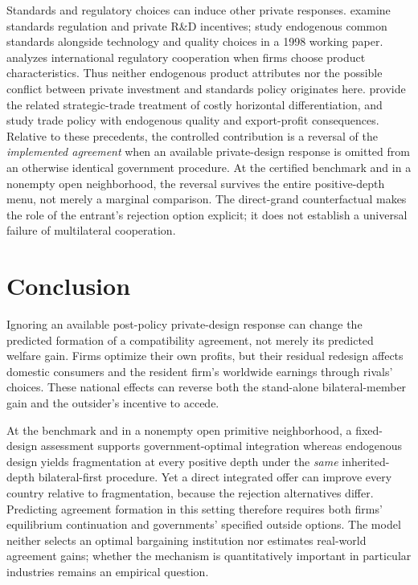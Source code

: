 \documentclass[11pt,a4paper]{article}
\theoremstyle{remark}\newtheorem{remark}[theorem]{Remark}
\begin{document}
Standards and regulatory choices can induce other private responses. \citet{CabralSalant2014} examine standards regulation and private R\&D incentives; \citet{LambertiniRossini1998} study endogenous common standards alongside technology and quality choices in a 1998 working paper. \citet{Grossman2021} analyzes international regulatory cooperation when firms choose product characteristics. Thus neither endogenous product attributes nor the possible conflict between private investment and standards policy originates here. \citet{BranderSpencer2015} provide the related strategic-trade treatment of costly horizontal differentiation, and \citet{ZhouSpencerVertinsky2002} study trade policy with endogenous quality and export-profit consequences. Relative to these precedents, the controlled contribution is a reversal of the \emph{implemented agreement} when an available private-design response is omitted from an otherwise identical government procedure. At the certified benchmark and in a nonempty open neighborhood, the reversal survives the entire positive-depth menu, not merely a marginal comparison. The direct-grand counterfactual makes the role of the entrant's rejection option explicit; it does not establish a universal failure of multilateral cooperation.

\section{Conclusion}
Ignoring an available post-policy private-design response can change the predicted formation of a compatibility agreement, not merely its predicted welfare gain. Firms optimize their own profits, but their residual redesign affects domestic consumers and the resident firm's worldwide earnings through rivals' choices. These national effects can reverse both the stand-alone bilateral-member gain and the outsider's incentive to accede.

At the benchmark and in a nonempty open primitive neighborhood, a fixed-design assessment supports government-optimal integration whereas endogenous design yields fragmentation at every positive depth under the \emph{same} inherited-depth bilateral-first procedure. Yet a direct integrated offer can improve every country relative to fragmentation, because the rejection alternatives differ. Predicting agreement formation in this setting therefore requires both firms' equilibrium continuation and governments' specified outside options. The model neither selects an optimal bargaining institution nor estimates real-world agreement gains; whether the mechanism is quantitatively important in particular industries remains an empirical question.
\end{document}
